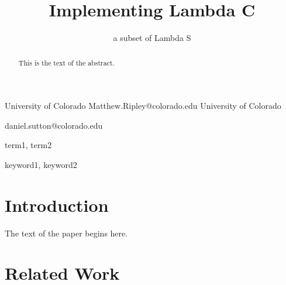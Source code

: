 \documentclass[preprint]{sigplanconf}
\begin{document}
\copyrightdata{[to be supplied]} 

\title{Implementing Lambda C}
\subtitle{a subset of Lambda S}

           {University of Colorado}
           {Matthew.Ripley@colorado.edu}
           {University of Colorado}
           {daniel.sutton@colorado.edu\begin{scriptsize}

\end{scriptsize}}

\maketitle

\begin{abstract}
This is the text of the abstract.
\end{abstract}


\terms
term1, term2

\keywords
keyword1, keyword2

\section{Introduction}

The text of the paper begins here.

\section{Related Work}
\end{document}
